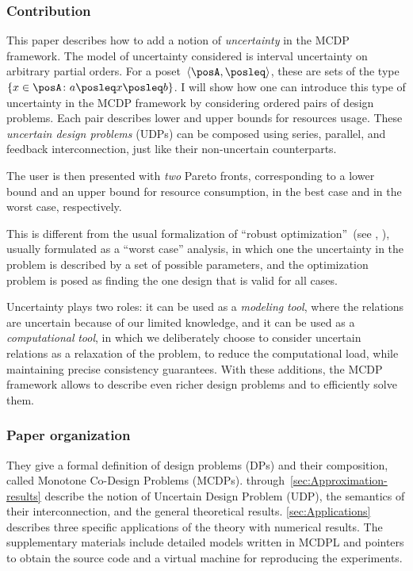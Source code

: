 \subsubsection*{Contribution}

This paper describes how to add a notion of \emph{uncertainty} in
the MCDP framework.
The model of uncertainty considered is interval
uncertainty on arbitrary partial orders.
For a poset~$\left\langle \posA,\posleq\right\rangle $,
these are sets of the type~$\{x\in\posA\colon a\posleq x\posleq b\}$.
I will show how one can introduce this type of uncertainty in the
MCDP framework by considering ordered pairs of design problems.
Each
pair describes lower and upper bounds for resources usage.
These \emph{uncertain
design problems} (UDPs) can be composed using series, parallel, and
feedback interconnection, just like their non-uncertain counterparts.

The user is then presented with \emph{two} Pareto fronts, corresponding
to a lower bound and an upper bound for resource consumption, in the
best case and in the worst case, respectively.

This is different from the usual formalization of ``robust optimization''~(see
\eg , \cite{bertsimas11theory,ben-tal09}), usually formulated as
a ``worst case'' analysis, in which one the uncertainty in the problem
is described by a set of possible parameters, and the optimization
problem is posed as finding the one design that is valid for all cases.

Uncertainty plays two roles: it can be used as a \emph{modeling} \emph{tool},
where the relations are uncertain because of our limited knowledge,
and it can be used as a \emph{computational} \emph{tool}, in which
we deliberately choose to consider uncertain relations as a relaxation
of the problem, to reduce the computational load, while maintaining
precise consistency guarantees.
With these additions, the MCDP framework
allows to describe even richer design problems and to efficiently
solve them.


\subsubsection*{Paper organization}


They give a formal definition of design problems
(DPs) and their composition, called Monotone Co-Design Problems (MCDPs).
 through~\cref{sec:Approximation-results}
describe the notion of Uncertain Design Problem (UDP), the semantics
of their interconnection, and the general theoretical results. \cref{sec:Applications}
describes three specific applications of the theory with numerical
results.
The supplementary materials include detailed models written
in MCDPL and pointers to obtain the source code and a virtual machine
for reproducing the experiments.


